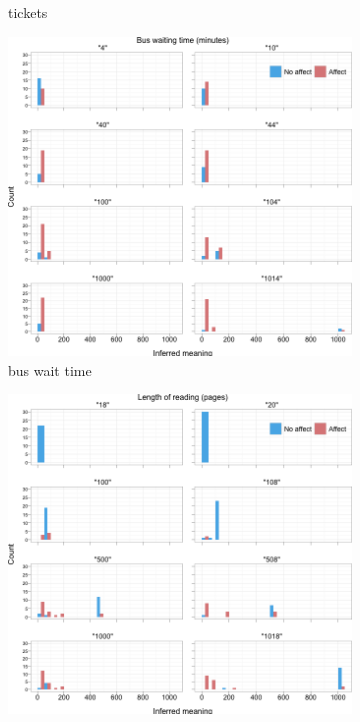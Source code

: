 \documentclass{article} %
\begin{document}
\begin{figure}
\begin{subfigure}[b]{0.5\textwidth}
		\caption{tickets}
	\end{subfigure}
	\begin{subfigure}[b]{0.33\textwidth}
                \centering
                \includegraphics[width=\textwidth]{humans_all_bus.png}
		\caption{bus wait time}
	\end{subfigure}
	\begin{subfigure}[b]{0.33\textwidth}
                \centering
                \includegraphics[width=\textwidth]{humans_all_reading.png}

\end{subfigure}
\end{figure}
\end{document}
